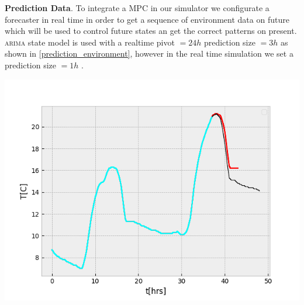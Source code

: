       \textbf{Prediction Data}.
      To integrate a \ac{MPC} in our simulator we configurate
      a forecaster in real time in order to get a sequence of environment data
      on future which will be used to control future states an get the correct
      patterns on present. \textsc{arima} state model is used with a realtime 
      pivot $= 24h$ prediction size $ = 3h$ as shown in \autoref{prediction_environment}, 
      however in the real time simulation we set a prediction size $=1h$ 
       \cite{jain2017study}.

      \begin{minipage}{\linewidth}
        \begin{center}
            \includegraphics[width=0.7\linewidth]{images/prediction}
            \label{prediction_environment}
        \end{center}
      \end{minipage}

